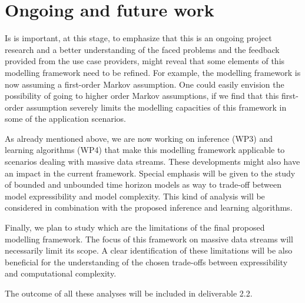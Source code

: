 \section{Ongoing and future work}\label{section:conclusions}

Is is important, at this stage, to emphasize that this is an ongoing project research and a better understanding of the faced problems and the feedback provided from the use case providers, might reveal that some elements of this modelling framework need to be refined.  For example, the modelling framework is now assuming a first-order Markov assumption. One could easily envision the possibility of going to higher order Markov assumptions, if we find that this first-order assumption severely limits the modelling capacities of this framework in some of the application scenarios. 

As already mentioned above,  we are now working on inference (WP3) and learning algorithms (WP4) that make this modelling framework applicable to scenarios dealing with massive data streams. These developments might also have an impact in the current framework. Special emphasis will be given to the study of bounded and unbounded time horizon models as way to trade-off between model expressibility and model complexity. This kind of analysis will be considered in combination with the proposed inference and learning algorithms.

Finally, we plan to study which are the limitations of the final proposed modelling framework. The focus of this  framework on massive data streams will necessarily limit its scope. A clear identification of these limitations will be also beneficial for the understanding of the chosen trade-offs between expressibility and computational complexity.

The outcome of all these analyses will be included in deliverable 2.2.
